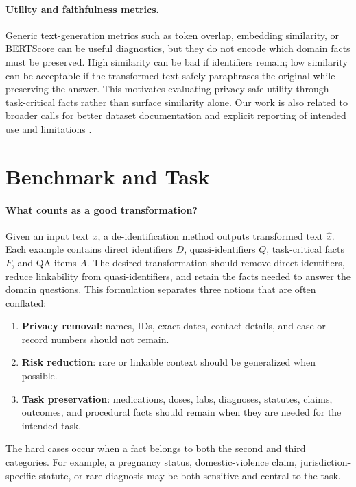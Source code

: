 \documentclass{article}
\begin{document}
\paragraph{Utility and faithfulness metrics.}
Generic text-generation metrics such as token overlap, embedding similarity, or
BERTScore \cite{bertscore} can be useful diagnostics, but they do not encode
which domain facts must be preserved.  High similarity can be bad if identifiers
remain; low similarity can be acceptable if the transformed text safely
paraphrases the original while preserving the answer.  This motivates evaluating
privacy-safe utility through task-critical facts rather than surface similarity
alone.  Our work is also related to broader calls for better dataset
documentation and explicit reporting of intended use and limitations
\cite{gebru2021datasheets,bender2018datastatements}.

\section{Benchmark and Task}

\paragraph{What counts as a good transformation?}
Given an input text $x$, a de-identification method outputs transformed text
$\hat{x}$.  Each example contains direct identifiers $D$, quasi-identifiers $Q$,
task-critical facts $F$, and QA items $A$.  The desired transformation should
remove direct identifiers, reduce linkability from quasi-identifiers, and retain
the facts needed to answer the domain questions.  This formulation separates
three notions that are often conflated:
\begin{enumerate}[leftmargin=*,nosep]
  \item \textbf{Privacy removal}: names, IDs, exact dates, contact details, and
  case or record numbers should not remain.
  \item \textbf{Risk reduction}: rare or linkable context should be generalized
  when possible.
  \item \textbf{Task preservation}: medications, doses, labs, diagnoses,
  statutes, claims, outcomes, and procedural facts should remain when they are
  needed for the intended task.
\end{enumerate}
The hard cases occur when a fact belongs to both the second and third categories.
For example, a pregnancy status, domestic-violence claim, jurisdiction-specific
statute, or rare diagnosis may be both sensitive and central to the task.
\end{document}
